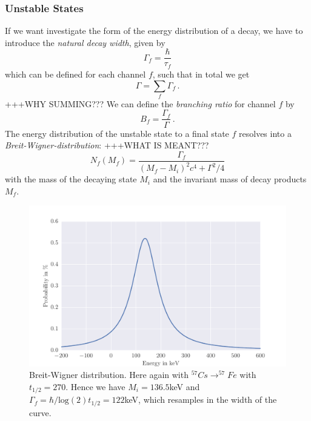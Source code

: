 \subsubsection{Unstable States}
\label{ssub:Unstable States}
If we want investigate the form of the energy distribution of a decay, we have to 
introduce the \emph{natural decay width}, given by
\begin{equation}
    \Gamma_f = \frac{\hbar}{\tau_f} 
\end{equation}
which can be defined for each channel $f$, such that in total we get
\begin{equation}
    \Gamma = \sum_{f} \Gamma_f \, .
\end{equation}
+++WHY SUMMING???
We can define the \emph{branching ratio} for channel $f$ by
\begin{equation}
    B_f = \frac{\Gamma_f}{\Gamma} \, .
\end{equation}
The energy distribution of the unstable state to a final state $f$ resolves into a 
\emph{Breit-Wigner-distribution}: +++WHAT IS MEANT???
\begin{equation}
    N_f(M_f) = \frac{\Gamma_f}{(M_f-M_i)^2 c^4 + \Gamma^2/4}
\end{equation}
with the mass of the decaying state $M_i$ and the invariant mass of decay products $M_f$.
\begin{figure}[htpb]
    \centering
    \includegraphics[width=0.9\linewidth]{analysis/figures/breit_wigner}
    \caption{Breit-Wigner distribution. Here again with
        $^{57}Cs\rightarrow ^{57}Fe$ with $t_{1/2}=270$. Hence we have $M_i = 136.5$keV and
    $\Gamma_f = \hbar / \textrm{log}(2)t_{1/2} = 122$keV, which resamples in the width of the curve.}
    \label{fig:name}
\end{figure}
\clearpage


